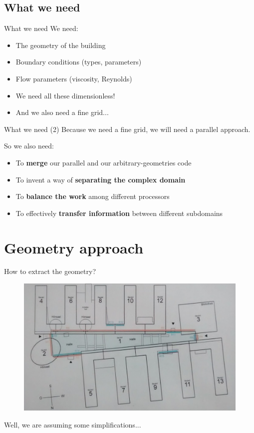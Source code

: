 \documentclass[9pt,pdftex]{beamer}
\begin{document}
\subsection{What we need}
\begin{frame}{What we need}
 We need:
 \begin{itemize}
  \item The geometry of the building
  \item Boundary conditions (types, parameters)
  \item Flow parameters (viscosity, Reynolds)
  \pause
  \item We need all these dimensionless!
  \pause
  \item And we also need a fine grid...
 \end{itemize}
\end{frame}

\begin{frame}{What we need (2)}
 Because we need a fine grid, we will need a parallel approach.
 
 So we also need:
 \begin{itemize}
  \item To \textbf{merge} our parallel and our arbitrary-geometries code
  \item To invent a way of \textbf{separating the complex domain}
  \item To \textbf{balance the work} among different processors
  \item To effectively \textbf{transfer information} between different subdomains
 \end{itemize}
\end{frame}

\section{Geometry approach}
\begin{frame}{How to extract the geometry?}
 \begin{figure}
 \includegraphics[scale=0.25]{fire_plan}
\end{figure}
\pause Well, we are assuming some simplifications...
\end{frame}
\end{document}
